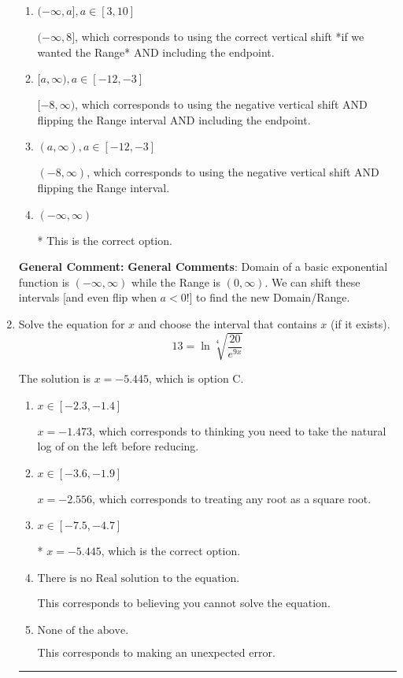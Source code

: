 \documentclass{extbook}[14pt]
\newcommand{\litem}[1]{\item #1

\rule{\textwidth}{0.4pt}}
\begin{document}
\begin{enumerate}
{\begin{enumerate}[label=\Alph*.]
$(-\infty, 8)$, which corresponds to using the correct vertical shift *if we wanted the Range*.
\item \( (-\infty, a], a \in [3, 10] \)

$(-\infty, 8]$, which corresponds to using the correct vertical shift *if we wanted the Range* AND including the endpoint.
\item \( [a, \infty), a \in [-12, -3] \)

$[-8, \infty)$, which corresponds to using the negative vertical shift AND flipping the Range interval AND including the endpoint.
\item \( (a, \infty), a \in [-12, -3] \)

$(-8, \infty)$, which corresponds to using the negative vertical shift AND flipping the Range interval.
\item \( (-\infty, \infty) \)

* This is the correct option.
\end{enumerate}

\textbf{General Comment:} \textbf{General Comments}: Domain of a basic exponential function is $(-\infty, \infty)$ while the Range is $(0, \infty)$. We can shift these intervals [and even flip when $a<0$!] to find the new Domain/Range.
}
\litem{
 Solve the equation for $x$ and choose the interval that contains $x$ (if it exists).
\[  13 = \ln{\sqrt[4]{\frac{20}{e^{9x}}}} \]

The solution is \( x = -5.445 \), which is option C.\begin{enumerate}[label=\Alph*.]
\item \( x \in [-2.3, -1.4] \)

$x = -1.473$, which corresponds to thinking you need to take the natural log of on the left before reducing.
\item \( x \in [-3.6, -1.9] \)

$x = -2.556$, which corresponds to treating any root as a square root.
\item \( x \in [-7.5, -4.7] \)

* $x = -5.445$, which is the correct option.
\item \( \text{There is no Real solution to the equation.} \)

This corresponds to believing you cannot solve the equation.
\item \( \text{None of the above.} \)

This corresponds to making an unexpected error.
\end{enumerate}

}
\end{enumerate}
\end{document}

